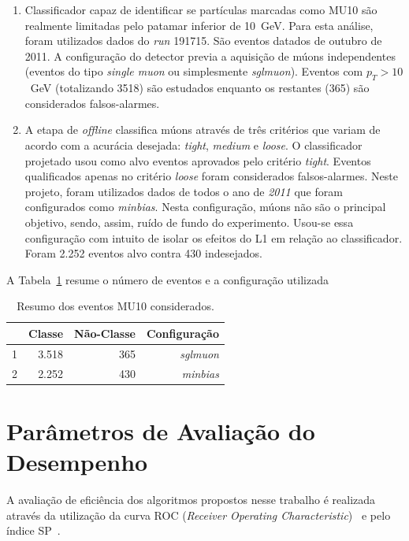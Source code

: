\begin{enumerate}
    \item Classificador capaz de identificar se partículas marcadas como MU10 são
    realmente limitadas pelo patamar inferior de 10~GeV. Para esta análise, foram
    utilizados dados do \emph{run} 191715. São eventos datados de outubro de 2011. A
    configuração do detector previa a aquisição de múons independentes (eventos do
    tipo \emph{single muon} ou simplesmente \emph{sglmuon}). Eventos com $p_T >
    10$~GeV (totalizando 3518) são estudados enquanto os restantes (365) são
    considerados falsos-alarmes.

    \item A etapa de  \emph{offline} classifica múons através de três critérios
    que variam de acordo com a acurácia desejada: \emph{tight}, \emph{medium} e
    \emph{loose}. O classificador projetado usou como alvo eventos aprovados
    pelo critério \emph{tight}. Eventos qualificados apenas no critério
    \emph{loose} foram considerados falsos-alarmes.  Neste projeto, foram
    utilizados dados de todos o ano de \emph{2011} que foram configurados como
    \emph{minbias}. Nesta configuração, múons não são o principal objetivo,
    sendo, assim, ruído de fundo do experimento. Usou-se essa configuração com
    intuito de isolar os efeitos do L1 em  relação ao classificador. Foram 2.252
    eventos alvo contra
    430 indesejados.

\end{enumerate}

A Tabela~\ref{table:Classes} resume o número de eventos e a configuração
utilizada

\begin{table}[htbp!]
  \centering
  \begin{tabular}{ l  r  r  r  }
      \toprule
                         & Classe & Não-Classe & Configuração\\
      \midrule
        1 & 3.518  & 365 & \emph{sglmuon} \\
        2 & 2.252 & 430 &  \emph{minbias} \\ 
      \bottomrule
  \end{tabular}
  \caption{Resumo dos eventos MU10 considerados.}
  \label{table:Classes}

\end{table}



\section{Parâmetros de Avaliação do Desempenho}
\label{sec:performance_indexes}
A avaliação de eficiência dos algoritmos propostos nesse trabalho é realizada
através da utilização da curva ROC (\emph{Receiver Operating
Characteristic})~\cite{TREES2001} e pelo índice SP~\cite{ref:SIMAS}.


